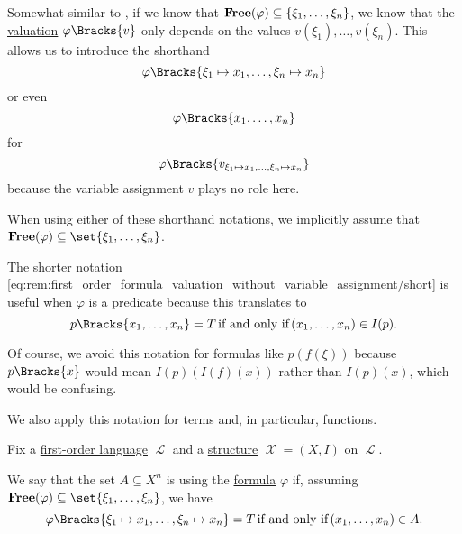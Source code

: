 \begin{remark}\label{rem:first_order_formula_valuation_without_variable_assignment}
  Somewhat similar to , if we know that \( \operatorname{\mathbf{Free}}(\varphi) \subseteq \{ \xi_1, \ldots, \xi_n \} \), we know that the \hyperref[def:first_order_valuation/formula_valuation]{valuation} \( \varphi\Bracks{v} \) only depends on the values \( v(\xi_1), \ldots, v(\xi_n) \). This allows us to introduce the shorthand
  \begin{equation}\label{eq:rem:first_order_formula_valuation_without_variable_assignment/long}
    \varphi\Bracks{\xi_1 \mapsto x_1, \ldots, \xi_n \mapsto x_n}
  \end{equation}
  or even
  \begin{equation}\label{eq:rem:first_order_formula_valuation_without_variable_assignment/short}
    \varphi\Bracks{x_1, \ldots, x_n}
  \end{equation}
  for
  \begin{equation*}
    \varphi\Bracks{v_{\xi_1 \mapsto x_1, \ldots, \xi_n \mapsto x_n}}
  \end{equation*}
  because the variable assignment \( v \) plays no role here.

  When using either of these shorthand notations, we implicitly assume that \( \boldop{Free}(\varphi) \subseteq \set{ \xi_1, \ldots, \xi_n } \).

  The shorter notation \eqref{eq:rem:first_order_formula_valuation_without_variable_assignment/short} is useful when \( \varphi \) is a predicate because this translates to
  \begin{equation*}
    p\Bracks{x_1, \ldots, x_n} = T \T{if and only if} (x_1, \ldots, x_n) \in I(p).
  \end{equation*}

  Of course, we avoid this notation for formulas like \( p(f(\xi)) \) because \( p\Bracks{x} \) would mean \( I(p)(I(f)(x)) \) rather than \( I(p)(x) \), which would be confusing.

  We also apply this notation for terms and, in particular, functions.
\end{remark}

\begin{definition}\label{def:first_order_definability}
  Fix a \hyperref[def:first_order_syntax]{first-order language} \( \mscrL \) and a \hyperref[def:first_order_structure]{structure} \( \mscrX = (X, I) \) on \( \mscrL \).

  We say that the set \( A \subseteq X^n \) is  using the \hyperref[def:first_order_syntax]{formula} \( \varphi \) if, assuming \( {\boldop{Free}(\varphi) \subseteq \set{ \xi_1, \ldots, \xi_n }} \), we have
  \begin{equation*}
    \varphi\Bracks{\xi_1 \mapsto x_1, \ldots, \xi_n \mapsto x_n} = T \T{if and only if} (x_1, \ldots, x_n) \in A.
  \end{equation*}
\end{definition}

